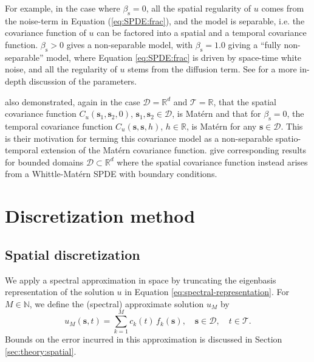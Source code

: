 \documentclass[12pt]{article} %
\begin{document}
For example, in the case where $\beta_\mathrm{s} = 0$, all the spatial regularity of $u$ comes from the noise-term in Equation (\ref{eq:SPDE:frac}), and the model is separable, i.e. the covariance function of $u$ can be factored into a spatial and a temporal covariance function. $\beta_\mathrm{s} > 0$ gives a non-separable model, with $\beta_\mathrm{s} = 1.0$ giving a ``fully non-separable'' model, where Equation \eqref{eq:SPDE:frac} is driven by %
space-time white noise, and all the regularity of $u$ stems from the diffusion term. See \citet[Section 3]{LindgrenBakka} for a more in-depth discussion of the parameters. 

\citet{LindgrenBakka} also demonstrated, again in the case $\mathcal{D} = \mathbb{R}^d$ and $\mathcal{T} = \mathbb{R}$, that the spatial covariance function $C_u(\boldsymbol{s}_1, \boldsymbol{s}_2, 0)$, $\boldsymbol{s}_1,\boldsymbol{s}_2\in\mathcal{D}$, is Matérn and that for $\beta_\mathrm{s} = 0$, the temporal covariance function $C_u(\boldsymbol{s}, \boldsymbol{s}, h)$, $h\in\mathbb{R}$, is Matérn for any $\boldsymbol{s}\in\mathcal{D}$. This is their motivation for terming this covariance model as a non-separable spatio-temporal extension of the Matérn covariance function. \citet{kirchner2022} give corresponding results for bounded domains $\mathcal{D}\subset\mathbb{R}^d$ where the spatial covariance function instead arises from a Whittle-Matérn SPDE with boundary conditions.


\section{Discretization method}\label{sec:disc}

\subsection{Spatial discretization}\label{sec:disc:space}

We apply a spectral approximation in space by truncating the eigenbasis representation of the solution $u$ in Equation 
\eqref{eq:spectral-representation}. For $M\in\mathbb N$, we define the (spectral) approximate solution $u_M$ by
%
\begin{equation} \label{eq:spectral-approximation}
u_M(\boldsymbol{s},t) =\sum_{k = 1}^M c_k(t)\, f_k(\boldsymbol{s}), \quad \boldsymbol{s}\in\mathcal{D}, \quad t\in\mathcal{T}.
\end{equation}
%
Bounds on the error incurred in this approximation is discussed in Section \ref{sec:theory:spatial}. 
\medskip
\end{document}
